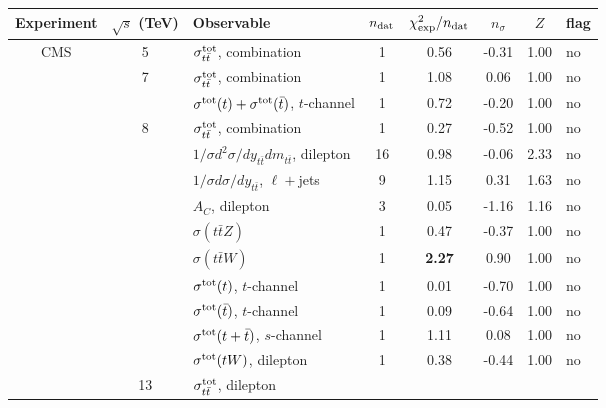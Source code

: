 \begin{table}[htbp]
{\fontsize{8pt}{8pt}\selectfont
  \centering
   \renewcommand{\arraystretch}{2}
   \setlength{\tabcolsep}{5pt}
   \begin{tabularx}{\textwidth}{ccXccccl}
  \toprule
  \textbf{Experiment}
  &\textbf{$\sqrt{s}$ (TeV)}
  &\textbf{Observable}
  & \textbf{$n_{\rm dat}$}
  & $\chi^2_{\rm exp}/n_{\rm dat}$
  & \textbf{$n_\sigma$}
  & $Z$
  & \textbf{flag} \\
  \midrule
  CMS
  & 5
  & $\sigma_{t\bar{t}}^{\rm tot}$, combination
  & 1
  & 0.56
  & -0.31
  & 1.00
  & no \\
  & 7
  & $\sigma_{t\bar{t}}^{\rm tot}$, combination
  & 1
  & 1.08
  & 0.06
  & 1.00
  & no \\
  & 
  & $\sigma^{\rm tot}(t) + \sigma^{\rm tot}(\bar{t})$, $t$-channel
  & 1
  & 0.72
  & -0.20
  & 1.00
  & no \\
  & 8
  & $\sigma_{t\bar{t}}^{\rm tot}$, combination
  & 1
  & 0.27 
  & -0.52
  & 1.00
  & no \\
   & 
  & $1/\sigma d^2\sigma/dy_{t\bar{t}}dm_{t\bar{t}}$, dilepton 
  & 16
  & 0.98
  & -0.06
  & 2.33
  & no \\
   & 
  & $1/\sigma d\sigma/dy_{t\bar{t}}$, $\ell+$jets 
  & 9
  & 1.15
  & 0.31
  & 1.63
  & no \\
  & 
  & $A_C$, dilepton
  & 3
  & 0.05
  & -1.16
  & 1.16
  & no \\
  & 
  & $\sigma(t\bar{t}Z)$
  & 1
  & 0.47
  & -0.37
  & 1.00
  & no\\
  & 
  & $\sigma(t\bar{t}W)$
  & 1
  & {\bf 2.27}
  & 0.90
  & 1.00
  &  no\\
  & 
  & $\sigma^{\rm tot}(t)$, $t$-channel
  & 1
  & 0.01
  & -0.70
  & 1.00
  & no \\
  & 
  & $\sigma^{\rm tot}(\bar{t})$, $t$-channel
  & 1
  & 0.09
  & -0.64
  & 1.00
  & no \\
  & 
  & $\sigma^{\rm tot}(t + \bar{t})$, $s$-channel
  & 1
  & 1.11 
  & 0.08
  & 1.00
  & no \\
  & 
  & $\sigma^{\rm tot}(t W)$, dilepton
  & 1
  & 0.38
  & -0.44
  & 1.00
  & no \\
   & 13
  & $\sigma_{t\bar{t}}^{\rm tot}$, dilepton  

\end{tabularx}}
\end{table}
